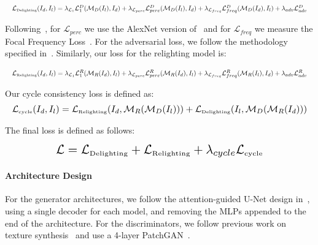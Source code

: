 {\begin{align} \label{eq:delighting}
	\resizebox{\hsize}{!}{$\mathcal{L}_{\text{\tiny{Delighting}}} (I_d, I_l) = \lambda_{\mathcal{L}_1}\mathcal{L}_1^D (\mathcal{M}_D(I_{l}), I_{d}) +  \lambda_{\mathcal{L}_{perc}}\mathcal{L}_{perc}^D (\mathcal{M}_D(I_{l}), I_{d}) + \lambda_{\mathcal{L}_{freq}}\mathcal{L}_{freq}^D (\mathcal{M}_D(I_{d}), I_{l})  + \lambda_{adv}\mathcal{L}_{adv}^D $}
\end{align}


Following~\cite{rodriguezpardo2023UMat,rodriguez2023neubtf,garces2023towards}, for $\mathcal{L}_{perc}$ we use the AlexNet version of~\cite{zhang2018unreasonable} and for $\mathcal{L}_{freq}$ we measure the Focal Frequency Loss~\cite{jiang2021focal}. For the adversarial loss, we follow the methodology specified in~\cite{zhu2017unpaired}. Similarly, our loss for the relighting model is:

\begin{align} \label{eq:relighting}
	\resizebox{\hsize}{!}{$\mathcal{L}_{\text{\tiny{Relighting}}} (I_d, I_l)= \lambda_{\mathcal{L}_1}\mathcal{L}_1^R (\mathcal{M}_R(I_{d}), I_{l}) +  \lambda_{\mathcal{L}_{perc}}\mathcal{L}_{perc}^R (\mathcal{M}_R(I_{d}), I_{l}) + \lambda_{\mathcal{L}_{freq}}\mathcal{L}_{freq}^R (\mathcal{M}_R(I_{l}), I_{d})  + \lambda_{adv}\mathcal{L}_{adv}^R $}
\end{align}

Our cycle consistency loss is defined as:
\begin{align} \label{eq:cycle_loss}
	\resizebox{\hsize}{!}{$\mathcal{L}_{\text{\tiny{cycle}}} (I_d, I_l) = \mathcal{L}_{\text{\tiny{Relighting}}}(I_d, \mathcal{M}_R(\mathcal{M}_D(I_l))) + \mathcal{L}_{\text{\tiny{Delighting}}}(I_l, \mathcal{M}_D(\mathcal{M}_R(I_d)))           $} 
\end{align}

The final loss is defined as follows:

\begin{align} \label{eq:cycle_loss}
	\resizebox{.7\hsize}{!}{$\mathcal{L} = \mathcal{L}_{\text{\tiny{Delighting}}} +  \mathcal{L}_{\text{\tiny{Relighting}}}  + \lambda_{cycle}\mathcal{L}_{\text{\tiny{cycle}}}                    $} 
\end{align}

}

\paragraph*{\textbf{Architecture Design}} For the generator architectures, we follow the attention-guided U-Net design in~\cite{rodriguezpardo2023UMat}, using a single decoder for each model, and removing the MLPs appended to the end of the architecture. For the discriminators, we follow previous work on texture synthesis~\cite{rodriguezpardo2022seamlessgan,zhou2018non} and use a 4-layer PatchGAN~\cite{isola2017image}. 

